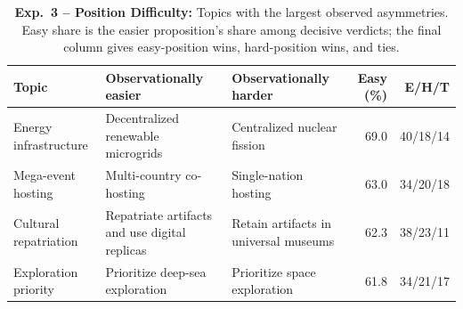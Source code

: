 \documentclass{article}
\begin{document}
\begin{table}[t]
  \centering
  \footnotesize
  \caption{\textbf{Exp.~3 -- Position Difficulty:} Topics with the largest observed asymmetries. Easy share is the easier proposition's share among decisive verdicts; the final column gives easy-position wins, hard-position wins, and ties.}
  \label{tab:current-position-difficulty}
  \begin{tabularx}{\textwidth}{@{}>{\raggedright\arraybackslash}p{}>{\raggedright\arraybackslash}X>{\raggedright\arraybackslash}Xrr@{}}
    \toprule
    Topic & Observationally easier & Observationally harder & Easy (\%) & E/H/T \\
    \midrule
    Energy infrastructure & Decentralized renewable microgrids & Centralized nuclear fission & 69.0 & 40/18/14 \\
    Mega-event hosting & Multi-country co-hosting & Single-nation hosting & 63.0 & 34/20/18 \\
    Cultural repatriation & Repatriate artifacts and use digital replicas & Retain artifacts in universal museums & 62.3 & 38/23/11 \\
    Exploration priority & Prioritize deep-sea exploration & Prioritize space exploration & 61.8 & 34/21/17 \\
    \bottomrule
  \end{tabularx}
\end{table}

\end{document}
